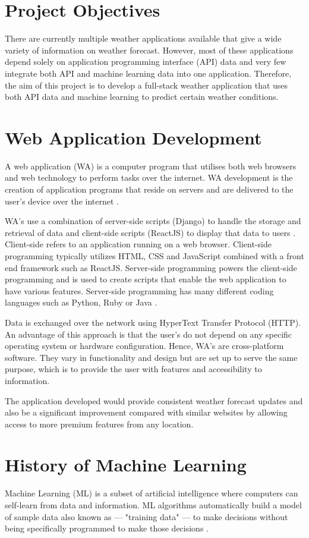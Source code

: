 \section{Project Objectives}
There are currently multiple weather applications available that give a wide variety of information on weather forecast. However, most of these applications depend solely on application programming interface (API) data and very few integrate both API and machine learning data into one application. Therefore, the aim of this project is to develop a full-stack weather application that uses both API data and machine learning to predict certain weather conditions. 

\section{Web Application Development}
A web application (WA) is a computer program that utilises both web browsers and web technology to perform tasks over the internet. WA development is the creation of application programs that reside on servers and are delivered to the user's device over the internet \cite{WebAppDef}.

WA's use a combination of server-side scripts (Django) to handle the storage and retrieval of data and client-side scripts (ReactJS) to display that data to users \cite{WebApp}. Client-side refers to an application running on a web browser. Client-side programming typically utilizes HTML, CSS and JavaScript combined with a front end framework such as ReactJS. Server-side programming powers the client-side programming and is used to create scripts that enable the web application to have various features. Server-side programming has many different coding languages such as Python, Ruby or Java \cite{WebAppDef}.

Data is exchanged over the network using HyperText Transfer Protocol (HTTP). An advantage of this approach is that the user's do not depend on any specific operating system or hardware configuration. Hence, WA's are cross-platform software. They vary in functionality and design but are set up to serve the same purpose, which is to provide the user with features and accessibility to information.

The application developed would provide consistent weather forecast updates and also be a significant improvement compared with similar websites by allowing access to more premium features from any location. 

\section{History of Machine Learning}
Machine Learning (ML) is a subset of artificial intelligence where computers can self-learn from data and information. ML algorithms automatically build a model of sample data also known as — "training data" — to make decisions without being specifically programmed to make those decisions \cite{MLAlgorithms}.

